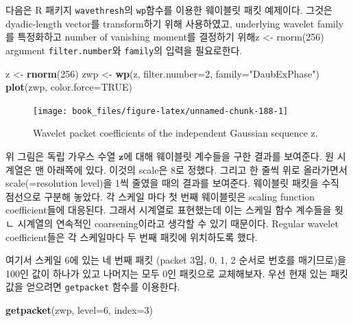 \documentclass[b5paper,]{scrbook}
\makeatletter
\newenvironment{Shaded}{\begin{snugshade}}{\end{snugshade}}
\newcommand{\KeywordTok}[1]{\textcolor[rgb]{0.13,0.29,0.53}{\textbf{{#1}}}}
\newcommand{\DataTypeTok}[1]{\textcolor[rgb]{0.13,0.29,0.53}{{#1}}}
\newcommand{\DecValTok}[1]{\textcolor[rgb]{0.00,0.00,0.81}{{#1}}}
\newcommand{\StringTok}[1]{\textcolor[rgb]{0.31,0.60,0.02}{{#1}}}
\newcommand{\OtherTok}[1]{\textcolor[rgb]{0.56,0.35,0.01}{{#1}}}
\newcommand{\NormalTok}[1]{{#1}}
\theoremstyle{plain}
\theoremstyle{definition}
\numberwithin{equation}{section}
\newenvironment{kframe}{%
\medskip{}
\setlength{\fboxsep}{.8em}
 \def\at@end@of@kframe{}%
 \ifinner\ifhmode%
  \def\at@end@of@kframe{\end{minipage}}%
  \begin{minipage}{\columnwidth}%
 \fi\fi%
 \def\FrameCommand##1{\hskip\@totalleftmargin \hskip-\fboxsep
 \colorbox{shadecolor}{##1}\hskip-\fboxsep
     \hskip-\linewidth \hskip-\@totalleftmargin \hskip\columnwidth}%
 \MakeFramed {\advance\hsize-\width
   \@totalleftmargin\z@ \linewidth\hsize
   \@setminipage}}%
 {\par\unskip\endMakeFramed%
 \at@end@of@kframe}
\renewenvironment{Shaded}{\begin{kframe}}{\end{kframe}}
\makeatother
\begin{document}
다음은 R 패키지 \texttt{wavethresh}의 \texttt{wp}함수를 이용한 웨이블릿
패킷 예제이다. 그것은 dyadic-length vector를 transform하기 위해
사용하였고, underlying wavelet family를 특정화하고 number of vanishing
moment를 결정하기 위해z \textless{}- rnorm(256) argument
\texttt{filter.number}와 \texttt{family}의 입력을 필요로한다.

\begin{Shaded}
\begin{Highlighting}[]
\NormalTok{z <-}\StringTok{ }\KeywordTok{rnorm}\NormalTok{(}\DecValTok{256}\NormalTok{)}
\NormalTok{zwp <-}\StringTok{ }\KeywordTok{wp}\NormalTok{(z, }\DataTypeTok{filter.number=}\DecValTok{2}\NormalTok{, }\DataTypeTok{family=}\StringTok{"DaubExPhase"}\NormalTok{)}
\KeywordTok{plot}\NormalTok{(zwp, }\DataTypeTok{color.force=}\OtherTok{TRUE}\NormalTok{)}
\end{Highlighting}
\end{Shaded}

\begin{figure}

{\centering \texttt{[image: book\_files/figure-latex/unnamed-chunk-188-1]} 

}

\caption{Wavelet packet coefficients of the independent Gaussian sequence z.}\label{fig:unnamed-chunk-188}
\end{figure}

위 그림은 독립 가우스 수열 \(\mathbf{z}\)에 대해 웨이블릿 계수들을 구한
결과를 보여준다. 원 시계열은 맨 아래쪽에 있다. 이것의 scale은 8로
정했다. 그리고 한 줄씩 위로 올라가면서 scale(=resolution level)을 1씩
줄였을 때의 결과를 보여준다. 웨이블릿 패킷을 수직 점선으로 구분해
놓았다. 각 스케일 마다 첫 번째 웨이블릿은 scaling function
coefficient들에 대응된다. 그래서 시계열로 표현했는데 이는 스케일 함수
계수들을 웟ㄴ 시계열의 연속적인 coarsening이라고 생각할 수 있기
때문이다. Regular wavelet coefficient들은 각 스케일마다 두 번째 패킷에
위치하도록 했다.

여기서 스케일 6에 있는 네 번째 패킷 (packet 3임, 0, 1, 2 순서로 번호를
매기므로)을 100인 값이 하나가 있고 나머지는 모두 0인 패킷으로
교체해보자. 우선 현재 있는 패킷 값을 얻으려면 \texttt{getpacket} 함수를
이용한다.

\begin{Shaded}
\begin{Highlighting}[]
\KeywordTok{getpacket}\NormalTok{(zwp, }\DataTypeTok{level=}\DecValTok{6}\NormalTok{, }\DataTypeTok{index=}\DecValTok{3}\NormalTok{)}
\end{Highlighting}
\end{Shaded}
\end{document}
